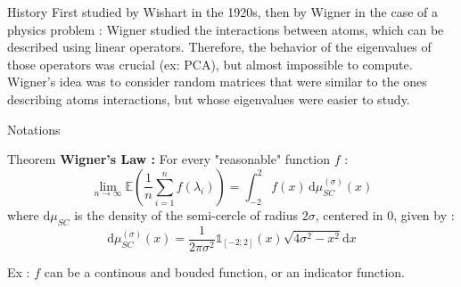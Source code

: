 \documentclass[10pt, a4paper]{beamer}
\begin{document}
\begin{frame}{History}
First studied by Wishart in the 1920s, then by Wigner in the case of a physics problem : Wigner studied the interactions between atoms, which can be described using linear operators. Therefore, the behavior of the eigenvalues of those operators was crucial (ex: PCA), but almost impossible to compute. Wigner's idea was to consider random matrices that were 
similar to the ones describing atoms interactions, but whose eigenvalues were easier to study.
\end{frame}

\begin{frame}{Notations}

\end{frame}

\begin{frame}{Theorem}
\textbf{Wigner's Law : } For every "reasonable" function $f$ : 
\[ \lim_{n \to \infty} \mathbb{E}\left (\frac{1}{n} \sum_{i=1}^n f(\lambda_i)\right ) = \int_{-2}^2 f(x) \, \mathrm{d}\mu_{SC}^{(\sigma)}(x) \] where $\mathrm{d}\mu_{SC}$ is the density of the semi-cercle of radius $2\sigma$, centered in $0$, given by  : \[ \mathrm{d}\mu_{SC}^{(\sigma)}(x) =\frac{1}{2\pi{\sigma^2}}\mathds{1}_{[-2;2]}(x)\sqrt{4\sigma^2-x^2} \mathrm{d}x \]

Ex : $f$ can be a continous and bouded function, or an indicator function.
\end{frame}
\end{document}
